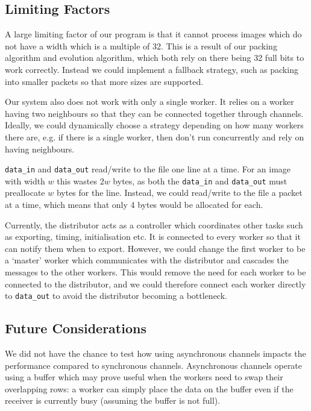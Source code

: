 \documentclass{article}
\begin{document}
    \subsection{Limiting Factors} \label{limits}

    A large limiting factor of our program is that it cannot process images which do not have a width which is a multiple of 32. This is a result of our packing algorithm and evolution algorithm, which both rely on there being 32 full bits to work correctly. Instead we could implement a fallback strategy, such as packing into smaller packets so that more sizes are supported.

    Our system also does not work with only a single worker. It relies on a worker having two neighbours so that they can be connected together through channels. Ideally, we could dynamically choose a strategy depending on how many workers there are, e.g. if there is a single worker, then don't run concurrently and rely on having neighbours.

    \verb|data_in| and \verb|data_out| read/write to the file one line at a time. For an image with width $w$ this wastes $2w$ bytes, as both the \verb|data_in| and \verb|data_out| must preallocate $w$ bytes for the line. Instead, we could read/write to the file a packet at a time, which means that only 4 bytes would be allocated for each.

    Currently, the distributor acts as a controller which coordinates other tasks such as exporting, timing, initialisation etc. It is connected to every worker so that it can notify them when to export. However, we could change the first worker to be a `master' worker which communicates with the distributor and cascades the messages to the other workers. This would remove the need for each worker to be connected to the distributor, and we could therefore connect each worker directly to \verb|data_out| to avoid the distributor becoming a bottleneck. 

    \subsection{Future Considerations}
    
    We did not have the chance to test how using asynchronous channels impacts the performance compared to synchronous channels. Asynchronous channels operate using a buffer which may prove useful when the workers need to swap their overlapping rows: a worker can simply place the data on the buffer even if the receiver is currently busy (assuming the buffer is not full).
\end{document}
